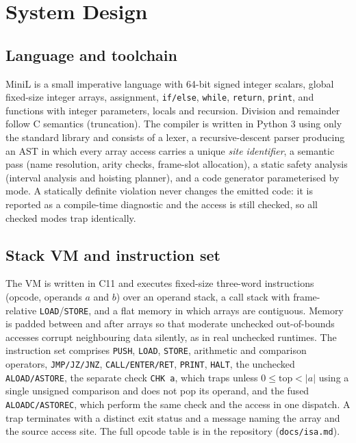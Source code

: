 \documentclass[11pt,a4paper]{article}
\begin{document}
\section{System Design}\label{sec:design}
\subsection{Language and toolchain}
MiniL is a small imperative language with 64-bit signed integer scalars, global fixed-size integer arrays, assignment, \texttt{if/else}, \texttt{while}, \texttt{return}, \texttt{print}, and functions with integer parameters, locals and recursion. Division and remainder follow C semantics (truncation). The compiler is written in Python 3 using only the standard library and consists of a lexer, a recursive-descent parser producing an AST in which every array access carries a unique \emph{site identifier}, a semantic pass (name resolution, arity checks, frame-slot allocation), a static safety analysis (interval analysis and hoisting planner), and a code generator parameterised by mode. A statically definite violation never changes the emitted code: it is reported as a compile-time diagnostic and the access is still checked, so all checked modes trap identically.

\subsection{Stack VM and instruction set}
The VM is written in C11 and executes fixed-size three-word instructions (opcode, operands $a$ and $b$) over an operand stack, a call stack with frame-relative \texttt{LOAD}/\texttt{STORE}, and a flat memory in which arrays are contiguous. Memory is padded between and after arrays so that moderate unchecked out-of-bounds accesses corrupt neighbouring data silently, as in real unchecked runtimes. The instruction set comprises \texttt{PUSH}, \texttt{LOAD}, \texttt{STORE}, arithmetic and comparison operators, \texttt{JMP/JZ/JNZ}, \texttt{CALL/ENTER/RET}, \texttt{PRINT}, \texttt{HALT}, the unchecked \texttt{ALOAD/ASTORE}, the separate check \texttt{CHK a}, which traps unless $0\le \text{top}<|a|$ using a single unsigned comparison and does not pop its operand, and the fused \texttt{ALOADC/ASTOREC}, which perform the same check and the access in one dispatch. A trap terminates with a distinct exit status and a message naming the array and the source access site. The full opcode table is in the repository (\texttt{docs/isa.md}).
\end{document}
